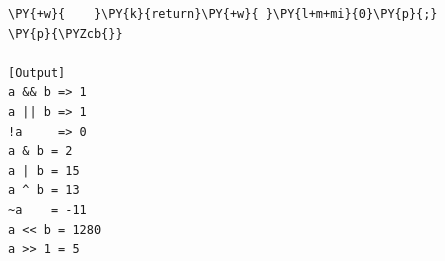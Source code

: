 \begin{Verbatim}[label=\makebox{\url{https://github.com/lucabaldini/cmepda/tree/master/slides/latex/snippets/bitwise_and_logical.c}},commandchars=\\\{\}]
\PY{+w}{    }\PY{k}{return}\PY{+w}{ }\PY{l+m+mi}{0}\PY{p}{;}
\PY{p}{\PYZcb{}}

[Output]
a && b => 1
a || b => 1
!a     => 0
a & b = 2
a | b = 15
a ^ b = 13
~a    = -11
a << b = 1280
a >> 1 = 5
\end{Verbatim}